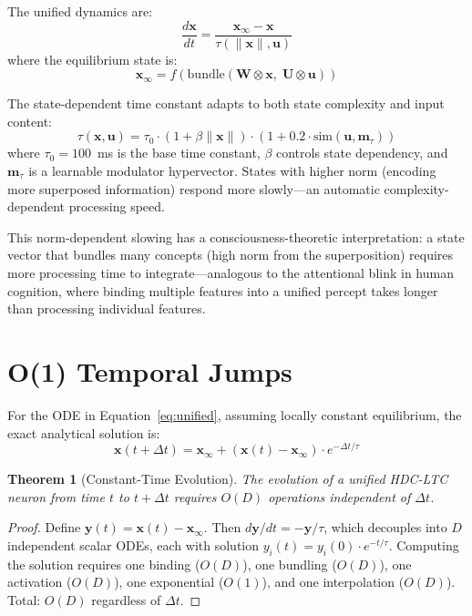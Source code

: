 \documentclass[12pt]{book}
\newtheorem{theorem}{Theorem}[chapter]
\newcommand{\bind}{\otimes}
\newcommand{\hvx}{\mathbf{x}}
\newcommand{\hvw}{\mathbf{W}}
\newcommand{\hvu}{\mathbf{U}}
\newcommand{\hvinput}{\mathbf{u}}
\newcommand{\xinf}{\mathbf{x}_\infty}
\begin{document}
The unified dynamics are:
\begin{equation}\label{eq:unified}
\frac{d\hvx}{dt} = \frac{\xinf - \hvx}{\tau(\|\hvx\|, \hvinput)}
\end{equation}
where the equilibrium state is:
\begin{equation}\label{eq:equilibrium}
\xinf = f\!\left(\text{bundle}(\hvw \bind \hvx, \; \hvu \bind \hvinput)\right)
\end{equation}

The state-dependent time constant adapts to both state complexity and input content:
\begin{equation}\label{eq:tau}
\tau(\hvx, \hvinput) = \tau_0 \cdot (1 + \beta \|\hvx\|) \cdot (1 + 0.2 \cdot \text{sim}(\hvinput, \mathbf{m}_\tau))
\end{equation}
where $\tau_0 = 100$~ms is the base time constant, $\beta$ controls state dependency, and $\mathbf{m}_\tau$ is a learnable modulator hypervector. States with higher norm (encoding more superposed information) respond more slowly---an automatic complexity-dependent processing speed.

This norm-dependent slowing has a consciousness-theoretic interpretation: a state vector that bundles many concepts (high norm from the superposition) requires more processing time to integrate---analogous to the attentional blink in human cognition, where binding multiple features into a unified percept takes longer than processing individual features.

\section{O(1) Temporal Jumps}

For the ODE in Equation~\ref{eq:unified}, assuming locally constant equilibrium, the exact analytical solution is:
\begin{equation}\label{eq:temporal-jump}
\hvx(t + \Delta t) = \xinf + (\hvx(t) - \xinf) \cdot e^{-\Delta t / \tau}
\end{equation}

\begin{theorem}[Constant-Time Evolution]\label{thm:constant-time}
The evolution of a unified HDC-LTC neuron from time $t$ to $t + \Delta t$ requires $O(D)$ operations independent of $\Delta t$.
\end{theorem}

\begin{proof}
Define $\mathbf{y}(t) = \hvx(t) - \xinf$. Then $d\mathbf{y}/dt = -\mathbf{y}/\tau$, which decouples into $D$ independent scalar ODEs, each with solution $y_i(t) = y_i(0) \cdot e^{-t/\tau}$. Computing the solution requires one binding ($O(D)$), one bundling ($O(D)$), one activation ($O(D)$), one exponential ($O(1)$), and one interpolation ($O(D)$). Total: $O(D)$ regardless of $\Delta t$.
\end{proof}
\end{document}
